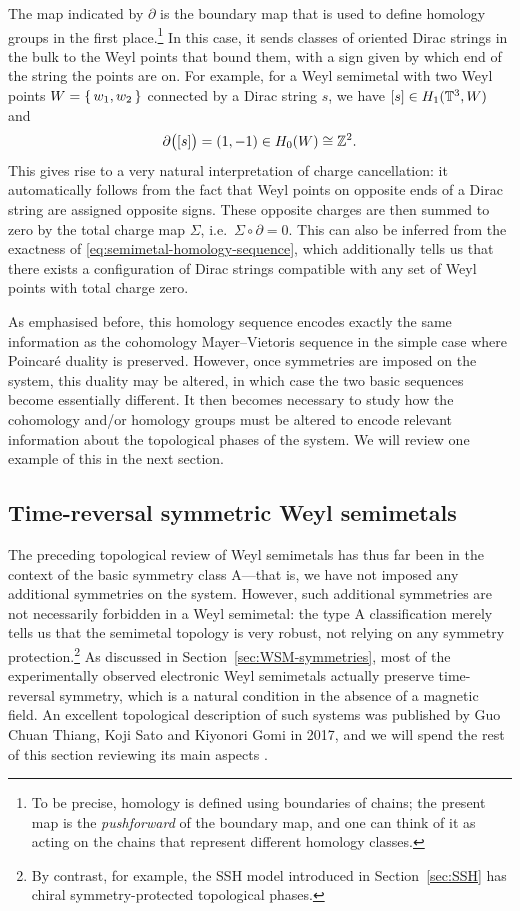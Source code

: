 The map indicated by $\partial$ is the boundary map that is used to define homology groups in the first place.\footnote{
	To be precise, homology is defined using boundaries of chains; the present map is the \emph{pushforward} of the boundary map, and one can think of it as acting on the chains that represent different homology classes.}
In this case, it sends classes of oriented Dirac strings in the bulk to the Weyl points that bound them, with a sign given by which end of the string the points are on. For example, for a Weyl semimetal with two Weyl points $W = \set{w_1,w_2}$ connected by a Dirac string $s$, we have $[s]\in H_1(\mathbb{T}^3,W)$ and
\begin{equation*}
	\partial\big([s]\big) = (1, -1)\in H_0(W)\cong\mathbb{Z}^2. 
\end{equation*}
This gives rise to a very natural interpretation of charge cancellation: it automatically follows from the fact that Weyl points on opposite ends of a Dirac string are assigned opposite signs. These opposite charges are then summed to zero by the total charge map $\Sigma$, i.e.\ $\Sigma\circ\partial = 0$. This can also be inferred from the exactness of \eqref{eq:semimetal-homology-sequence}, which additionally tells us that there exists a configuration of Dirac strings compatible with any set of Weyl points with total charge zero.

As emphasised before, this homology sequence encodes exactly the same information as the cohomology Mayer--Vietoris sequence in the simple case where Poincaré duality is preserved. However, once symmetries are imposed on the system, this duality may be altered, in which case the two basic sequences become essentially different. It then becomes necessary to study how the cohomology and/or homology groups must be altered to encode relevant information about the topological phases of the system. We will review one example of this in the next section.


\subsection{Time-reversal symmetric Weyl semimetals}\label{sec:T-WSMs}

The preceding topological review of Weyl semimetals has thus far been in the context of the basic symmetry class A---that is, we have not imposed any additional symmetries on the system. However, such additional symmetries are not necessarily forbidden in a Weyl semimetal: the type A classification merely tells us that the semimetal topology is very robust, not relying on any symmetry protection.\footnote{
	By contrast, for example, the SSH model introduced in Section~\ref{sec:SSH} has chiral symmetry-protected topological phases.}
As discussed in Section~\ref{sec:WSM-symmetries}, most of the experimentally observed electronic Weyl semimetals actually preserve time-reversal symmetry, which is a natural condition in the absence of a magnetic field. An excellent topological description of such systems was published by Guo Chuan Thiang, Koji Sato and Kiyonori Gomi in 2017, and we will spend the rest of this section reviewing its main aspects \cite{Thiang_equivariant}.

